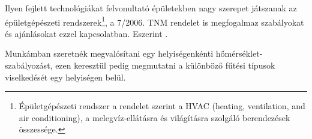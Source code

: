 Ilyen fejlett technológiákat felvonultató épületekben nagy szerepet játszanak az épületgépészeti rendszerek\footnote{Épületgépészeti rendszer a \cite{TNM2006} rendelet szerint a  HVAC (heating, ventilation, and air conditioning), a melegvíz-ellátásra és világításra szolgáló berendezések összessége.},
a 7/2006. TNM rendelet \cite{TNM2006} is megfogalmaz szabályokat és ajánlásokat ezzel kapcsolatban. Eszerint .
	



Munkámban szeretnék megvalósítani egy helyiségenkénti hőmérséklet-szabályozást, ezen keresztül pedig megmutatni a különböző fűtési típusok viselkedését egy helyiségen belül.





